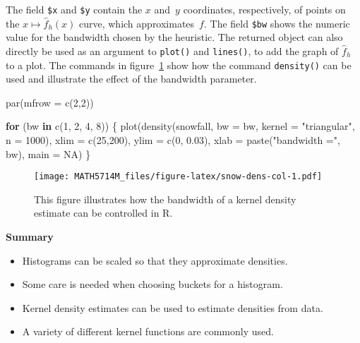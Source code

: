 \documentclass[
  a4paper,
]{article}
\newenvironment{Shaded}{\begin{snugshade}}{\end{snugshade}}
\newcommand{\AttributeTok}[1]{\textcolor[rgb]{0.77,0.63,0.00}{#1}}
\newcommand{\ConstantTok}[1]{\textcolor[rgb]{0.00,0.00,0.00}{#1}}
\newcommand{\ControlFlowTok}[1]{\textcolor[rgb]{0.13,0.29,0.53}{\textbf{#1}}}
\newcommand{\DecValTok}[1]{\textcolor[rgb]{0.00,0.00,0.81}{#1}}
\newcommand{\FloatTok}[1]{\textcolor[rgb]{0.00,0.00,0.81}{#1}}
\newcommand{\FunctionTok}[1]{\textcolor[rgb]{0.00,0.00,0.00}{#1}}
\newcommand{\NormalTok}[1]{#1}
\newcommand{\StringTok}[1]{\textcolor[rgb]{0.31,0.60,0.02}{#1}}
\providecommand{\tightlist}{%
  \setlength{\itemsep}{0pt}\setlength{\parskip}{0pt}}
\theoremstyle{definition}
\theoremstyle{definition}
\theoremstyle{definition}
\theoremstyle{definition}
\theoremstyle{remark}
\begin{document}
The field \texttt{\$x} and \texttt{\$y} contain the \(x\) and~\(y\) coordinates, respectively,
of points on the \(x \mapsto \hat f_h(x)\) curve, which approximates~\(f\).
The field \texttt{\$bw} shows the numeric value for the bandwidth chosen by
the heuristic. The returned object can also directly be used
as an argument to \texttt{plot()} and \texttt{lines()}, to add the graph of \(\hat f_h\)
to a plot. The commands in figure~\ref{fig:snow-dens-col} show how the
command \texttt{density()} can be used and illustrate the effect of the
bandwidth parameter.



\begin{Shaded}
\begin{Highlighting}[]
\FunctionTok{par}\NormalTok{(}\AttributeTok{mfrow =} \FunctionTok{c}\NormalTok{(}\DecValTok{2}\NormalTok{,}\DecValTok{2}\NormalTok{))}

\ControlFlowTok{for}\NormalTok{ (bw }\ControlFlowTok{in} \FunctionTok{c}\NormalTok{(}\DecValTok{1}\NormalTok{, }\DecValTok{2}\NormalTok{, }\DecValTok{4}\NormalTok{, }\DecValTok{8}\NormalTok{)) \{}
  \FunctionTok{plot}\NormalTok{(}\FunctionTok{density}\NormalTok{(snowfall, }\AttributeTok{bw =}\NormalTok{ bw, }\AttributeTok{kernel =} \StringTok{"triangular"}\NormalTok{, }\AttributeTok{n =} \DecValTok{1000}\NormalTok{),}
    \AttributeTok{xlim =} \FunctionTok{c}\NormalTok{(}\DecValTok{25}\NormalTok{,}\DecValTok{200}\NormalTok{),}
    \AttributeTok{ylim =} \FunctionTok{c}\NormalTok{(}\DecValTok{0}\NormalTok{, }\FloatTok{0.03}\NormalTok{),}
    \AttributeTok{xlab =} \FunctionTok{paste}\NormalTok{(}\StringTok{"bandwidth ="}\NormalTok{, bw),}
    \AttributeTok{main =} \ConstantTok{NA}\NormalTok{)}
\NormalTok{\}}
\end{Highlighting}
\end{Shaded}

\begin{figure}
\centering
\texttt{[image: MATH5714M\_files/figure-latex/snow-dens-col-1.pdf]}
\caption{\label{fig:snow-dens-col}This figure illustrates how the bandwidth of a kernel density estimate can be controlled in R.}
\end{figure}

\textbf{Summary}

\begin{itemize}
\tightlist
\item
  Histograms can be scaled so that they approximate densities.
\item
  Some care is needed when choosing buckets for a histogram.
\item
  Kernel density estimates can be used to estimate densities from data.
\item
  A variety of different kernel functions are commonly used.
\end{itemize}
\end{document}
